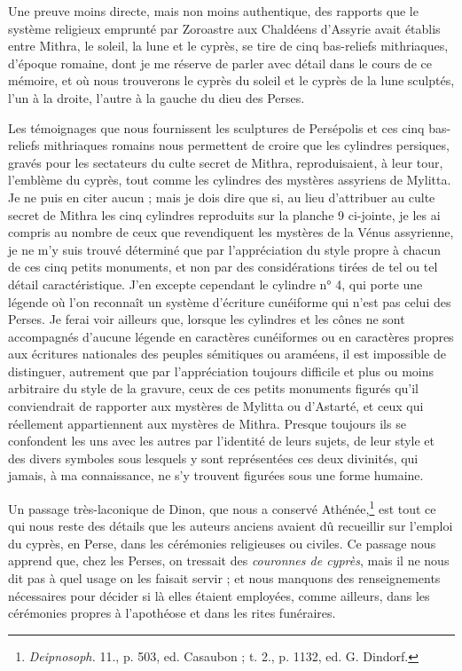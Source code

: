 \documentclass{article}
\begin{document}
Une preuve moins directe, mais non moins authentique, des rapports que le système religieux emprunté par Zoroastre aux Chaldéens d'Assyrie avait établis entre Mithra, le soleil, la lune et le cyprès, se tire de cinq bas-reliefs mithriaques, d'époque romaine, dont je me réserve de parler avec détail dans le cours de ce mémoire, et où nous trouverons le cyprès du soleil et le cyprès de la lune sculptés, l'un à la droite, l'autre à la gauche du dieu des Perses.

Les témoignages que nous fournissent les sculptures de Persépolis et ces cinq bas-reliefs mithriaques romains nous permettent de croire que les cylindres persiques, gravés pour les sectateurs du culte secret de Mithra, reproduisaient, à leur tour, l'emblème du cyprès, tout comme les cylindres des mystères assyriens de Mylitta. Je ne puis en citer aucun ; mais je dois dire que si, au lieu d'attribuer au culte secret de Mithra les cinq cylindres reproduits sur la planche 9 ci-jointe, je les ai compris au nombre de ceux que revendiquent les mystères de la Vénus assyrienne, je ne m'y suis trouvé déterminé que par l'appréciation du style propre à chacun de ces cinq petits monuments, et non par des considérations tirées de tel ou tel détail caractéristique. J'en excepte cependant le cylindre n° 4, qui porte une légende où l'on reconnaît un système d'écriture cunéiforme qui n'est pas celui des Perses. Je ferai voir ailleurs que, lorsque les cylindres et les cônes ne sont accompagnés d'aucune légende en caractères cunéiformes ou en caractères propres aux écritures nationales des peuples sémitiques ou araméens, il est impossible de distinguer, autrement que par l'appréciation toujours difficile et plus ou moins arbitraire du style de la gravure, ceux de ces petits monuments figurés qu'il conviendrait de rapporter aux mystères de Mylitta ou d'Astarté, et ceux qui réellement appartiennent aux mystères de Mithra. Presque toujours ils se confondent les uns avec les autres par l'identité de leurs sujets, de leur style et des divers symboles sous lesquels y sont représentées ces deux divinités, qui jamais, à ma connaissance, ne s'y trouvent figurées sous une forme humaine.

Un passage très-laconique de Dinon, que nous a conservé Athénée,\footnote{\emph{Deipnosoph.} 11., p. 503, ed. Casaubon ; t. 2., p. 1132, ed. G. Dindorf.} est tout ce qui nous reste des détails que les auteurs anciens avaient dû recueillir sur l'emploi du cyprès, en Perse, dans les cérémonies religieuses ou civiles. Ce passage nous apprend que, chez les Perses, on tressait des \emph{couronnes de cyprès}, mais il ne nous dit pas à quel usage on les faisait servir ; et nous manquons des renseignements nécessaires pour décider si là elles étaient employées, comme ailleurs, dans les cérémonies propres à l'apothéose et dans les rites funéraires.
\end{document}
